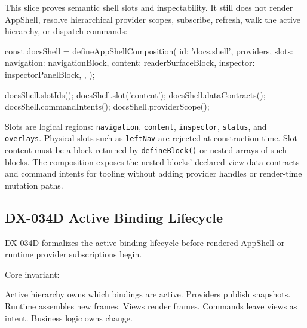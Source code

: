 This slice proves semantic shell slots and inspectability. It still does not render AppShell, resolve hierarchical provider scopes, subscribe, refresh, walk the active hierarchy, or dispatch commands:

\begin{CodeBlock}
const docsShell = defineAppShellComposition({
  id: 'docs.shell',
  providers,
  slots: {
    navigation: navigationBlock,
    content: readerSurfaceBlock,
    inspector: inspectorPanelBlock,
  },
});

docsShell.slotIds();
docsShell.slot('content');
docsShell.dataContracts();
docsShell.commandIntents();
docsShell.providerScope();
\end{CodeBlock}

Slots are logical regions: \texttt{n\allowbreak{}a\allowbreak{}v\allowbreak{}i\allowbreak{}g\allowbreak{}a\allowbreak{}t\allowbreak{}i\allowbreak{}o\allowbreak{}n}, \texttt{c\allowbreak{}o\allowbreak{}n\allowbreak{}t\allowbreak{}e\allowbreak{}n\allowbreak{}t}, \texttt{i\allowbreak{}n\allowbreak{}s\allowbreak{}p\allowbreak{}e\allowbreak{}c\allowbreak{}t\allowbreak{}o\allowbreak{}r}, \texttt{s\allowbreak{}t\allowbreak{}a\allowbreak{}t\allowbreak{}u\allowbreak{}s}, and \texttt{o\allowbreak{}v\allowbreak{}e\allowbreak{}r\allowbreak{}l\allowbreak{}a\allowbreak{}y\allowbreak{}s}. Physical slots such as \texttt{l\allowbreak{}e\allowbreak{}f\allowbreak{}t\allowbreak{}N\allowbreak{}a\allowbreak{}v} are rejected at construction time. Slot content must be a block returned by \texttt{d\allowbreak{}e\allowbreak{}f\allowbreak{}i\allowbreak{}n\allowbreak{}e\allowbreak{}B\allowbreak{}l\allowbreak{}o\allowbreak{}c\allowbreak{}k\allowbreak{}(\allowbreak{})} or nested arrays of such blocks. The composition exposes the nested blocks' declared view data contracts and command intents for tooling without adding provider handles or render-time mutation paths.

\subsection{DX-034D Active Binding Lifecycle}\label{record-132-dx-034d-active-binding-lifecycle}

DX-034D formalizes the active binding lifecycle before rendered AppShell or runtime provider subscriptions begin.

Core invariant:

\begin{CodeBlock}
Active hierarchy owns which bindings are active.
Providers publish snapshots.
Runtime assembles new frames.
Views render frames.
Commands leave views as intent.
Business logic owns change.
\end{CodeBlock}

